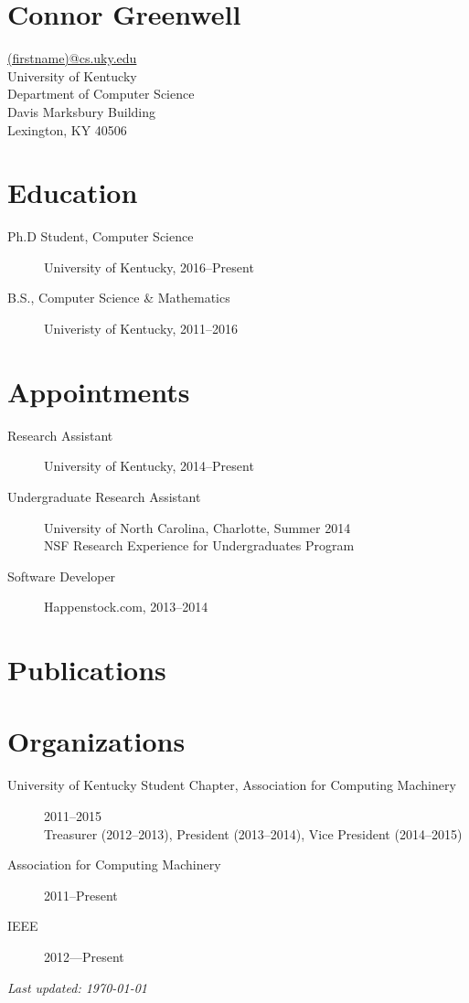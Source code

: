 \documentclass[12pt]{article}
\begin{document}
\section*{\bf\huge Connor Greenwell}
\href{mailto:(firstname)@cs.uky.edu}{(firstname)@cs.uky.edu} \\
University of Kentucky\\
Department of Computer Science\\
Davis Marksbury Building\\
Lexington, KY 40506

\section*{Education}

\begin{description}
    \item[Ph.D Student, Computer Science]
        University of Kentucky, 2016--Present
    \item[B.S., Computer Science \& Mathematics]
        Univeristy of Kentucky, 2011--2016
\end{description}

\section*{Appointments}

\begin{description}
    \item[Research Assistant]
        University of Kentucky, 2014--Present
    \item[Undergraduate Research Assistant]
        University of North Carolina, Charlotte, Summer 2014\\
        NSF Research Experience for Undergraduates Program
    \item[Software Developer]
        Happenstock.com, 2013--2014
\end{description}

\section*{Publications}

\nocite{*}
\printbibliography[heading=none]

\section*{Organizations}

\begin{description}
    \item[University of Kentucky Student Chapter, 
        Association for Computing Machinery] 
        2011--2015\\
        Treasurer (2012--2013), President (2013--2014), Vice President
        (2014--2015)
    \item[Association for Computing Machinery] 2011--Present
    \item[IEEE] 2012---Present
\end{description}

\vspace{\fill}
{\centering
    \small\emph{Last updated: \today}\par
}
\end{document}
